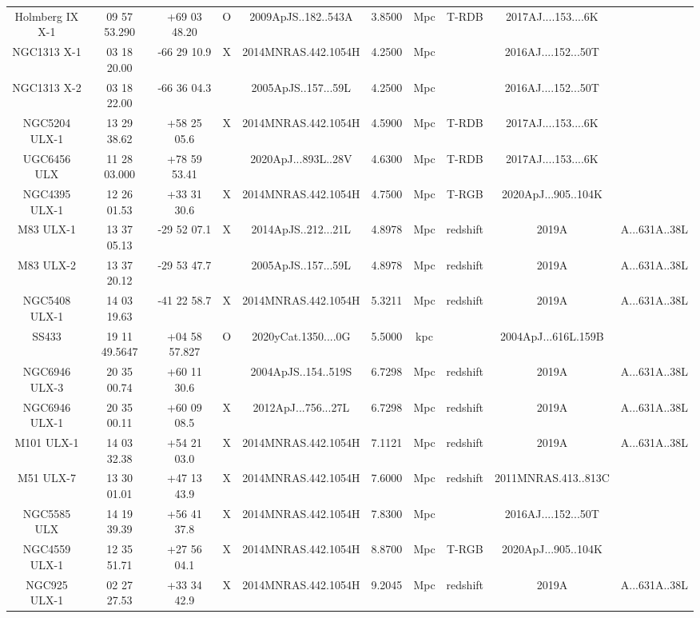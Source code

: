 \begin{table}
\begin{tabular}{ccccccccc}
Holmberg IX X-1 & 09 57 53.290 & +69 03 48.20 & O & 2009ApJS..182..543A & 3.8500 & Mpc & T-RDB & 2017AJ....153....6K \\
NGC1313 X-1 & 03 18 20.00 & -66 29 10.9 & X & 2014MNRAS.442.1054H & 4.2500 & Mpc &  & 2016AJ....152...50T \\
NGC1313 X-2 & 03 18 22.00 & -66 36 04.3 &  & 2005ApJS..157...59L & 4.2500 & Mpc &  & 2016AJ....152...50T \\
NGC5204 ULX-1 & 13 29 38.62 & +58 25 05.6 & X & 2014MNRAS.442.1054H & 4.5900 & Mpc & T-RDB & 2017AJ....153....6K \\
UGC6456 ULX & 11 28 03.000 & +78 59 53.41 &  & 2020ApJ...893L..28V & 4.6300 & Mpc & T-RDB & 2017AJ....153....6K \\
NGC4395 ULX-1 & 12 26 01.53 & +33 31 30.6 & X & 2014MNRAS.442.1054H & 4.7500 & Mpc & T-RGB & 2020ApJ...905..104K \\
M83 ULX-1 & 13 37 05.13 & -29 52 07.1 & X & 2014ApJS..212...21L & 4.8978 & Mpc & redshift & 2019A&A...631A..38L \\
M83 ULX-2 & 13 37 20.12 & -29 53 47.7 &  & 2005ApJS..157...59L & 4.8978 & Mpc & redshift & 2019A&A...631A..38L \\
NGC5408 ULX-1 & 14 03 19.63 & -41 22 58.7 & X & 2014MNRAS.442.1054H & 5.3211 & Mpc & redshift & 2019A&A...631A..38L \\
SS433 & 19 11 49.5647 & +04 58 57.827 & O & 2020yCat.1350....0G & 5.5000 & kpc &  & 2004ApJ...616L.159B \\
NGC6946 ULX-3 & 20 35 00.74 & +60 11 30.6 &  & 2004ApJS..154..519S & 6.7298 & Mpc & redshift & 2019A&A...631A..38L \\
NGC6946 ULX-1 & 20 35 00.11 & +60 09 08.5 & X & 2012ApJ...756...27L & 6.7298 & Mpc & redshift & 2019A&A...631A..38L \\
M101 ULX-1 & 14 03 32.38 & +54 21 03.0 & X & 2014MNRAS.442.1054H & 7.1121 & Mpc & redshift & 2019A&A...631A..38L \\
M51 ULX-7 & 13 30 01.01 & +47 13 43.9 & X & 2014MNRAS.442.1054H & 7.6000 & Mpc & redshift & 2011MNRAS.413..813C \\
NGC5585 ULX & 14 19 39.39 & +56 41 37.8 & X & 2014MNRAS.442.1054H & 7.8300 & Mpc &  & 2016AJ....152...50T \\
NGC4559 ULX-1 & 12 35 51.71 & +27 56 04.1 & X & 2014MNRAS.442.1054H & 8.8700 & Mpc & T-RGB & 2020ApJ...905..104K \\
NGC925 ULX-1 & 02 27 27.53 & +33 34 42.9 & X & 2014MNRAS.442.1054H & 9.2045 & Mpc & redshift & 2019A&A...631A..38L \\

\end{tabular}
\end{table}
